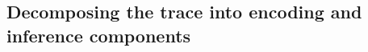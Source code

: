 %
%
%

\subsection{Decomposing the trace into encoding and inference components}
\label{ssec:methods_arc}

